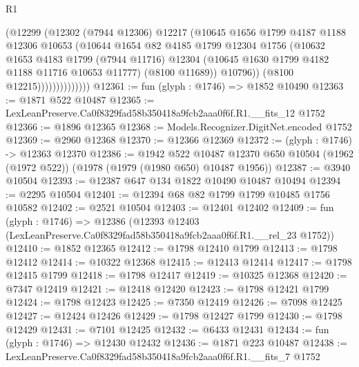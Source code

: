 \begin{lexlean}{R1}
\begin{coremodule}
                          (@12299
                            (@12302
                              (@7944 @12306)
                              @12217
                              (@10645
                                @1656
                                @1799
                                @4187
                                @1188
                                @12306
                                @10653
                                (@10644
                                  @1654
                                  @82
                                  @4185
                                  @1799
                                  @12304
                                  @1756
                                  (@10632
                                    @1653
                                    @4183
                                    @1799
                                    (@7944 @11716)
                                    @12304
                                    (@10645 @1630 @1799 @4182 @1188 @11716 @10653 @11777)
                                    (@8100 @11689))
                                  @10796))
                              (@8100 @12215))))))))))))))
@12361 := fun (glyph : @1746) => @1852 @10490
@12363 := @1871 @522 @10487
@12365 := LexLeanPreserve.Ca0f8329fad58b350418a9fcb2aaa0f6f.R1.__fits_12 @1752
@12366 := @1896 @12365
@12368 := Models.Recognizer.DigitNet.encoded @1752
@12369 := @2960 @12368
@12370 := @12366 @12369
@12372 := (glyph : @1746) -> @12363 @12370
@12386 := @1942
    @522
    @10487
    @12370
    @650
    @10504
    (@1962 (@1972 @522))
    (@1978 (@1979 (@1980 @650) @10487 @1956))
@12387 := @3940 @10504
@12393 := @12387 @647 @134 @1822 @10490 @10487 @10494
@12394 := @2295 @10504
@12401 := @12394 @68 @82 @1799 @1799 @10485 @1756 @10582
@12402 := @2521 @10504
@12403 := @12401 @12402
@12409 := fun (glyph : @1746) =>
  @12386 (@12393 @12403 (LexLeanPreserve.Ca0f8329fad58b350418a9fcb2aaa0f6f.R1.__rel_23 @1752))
@12410 := @1852 @12365
@12412 := @1798 @12410 @1799
@12413 := @1798 @12412
@12414 := @10322 @12368
@12415 := @12413 @12414
@12417 := @1798 @12415 @1799
@12418 := @1798 @12417
@12419 := @10325 @12368
@12420 := @7347 @12419
@12421 := @12418 @12420
@12423 := @1798 @12421 @1799
@12424 := @1798 @12423
@12425 := @7350 @12419
@12426 := @7098 @12425
@12427 := @12424 @12426
@12429 := @1798 @12427 @1799
@12430 := @1798 @12429
@12431 := @7101 @12425
@12432 := @6433 @12431
@12434 := fun (glyph : @1746) => @12430 @12432
@12436 := @1871 @223 @10487
@12438 := LexLeanPreserve.Ca0f8329fad58b350418a9fcb2aaa0f6f.R1.__fits_7 @1752

\end{coremodule}
\end{lexlean}
